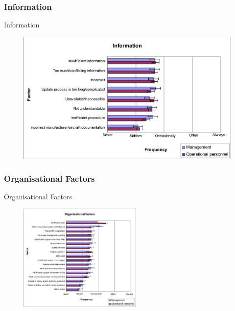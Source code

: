 \subsubsection{Information}
\begin{frame}{Information}{}
	\begin{figure}[H]
	\centering
	\includegraphics[width=\textwidth]{Grafik/Information}
\end{figure}
\end{frame}

\subsubsection{Organisational Factors}
\begin{frame}{Organisational Factors}{}
	\begin{figure}[H]
	\centering
	\includegraphics[width=230px]{Grafik/OrganisationalFactors}
\end{figure}
\end{frame}